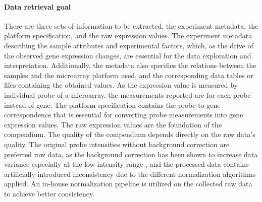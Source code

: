 






\paragraph{Data retrieval goal}\label{sec:command-data-goal}

There are three sets of information to be extracted, the experiment
metadata, the platform specification, and the raw expression values.
%
%
The experiment metadata describing the sample attributes and experimental
factors, which, as the drive of the observed gene expression changes, are
essential for the data exploration and interpretation.
%
Additionally, the metadata also specifies the relations between the samples
and the microarray platform used, and the corresponding data tables or files
containing the obtained values.
%
As the expression value is measured by individual probe of a microarray, the
measurements reported are for each probe instead of gene.
%
The platform specification contains the probe-to-gene correspondence that is
essential for converting probe measurements into gene expression values.
%
%
The raw expression values are the foundation of the compendium.  The quality of
the compendium depends directly on the raw data's quality.
%
The original probe intensities without background correction are preferred raw
data, as the background correction has been shown to increase data variance
especially at the low intensity range \cite{Irizarry2006, Ritchie2007}, and
the processed data contains artificially introduced inconsistency due to the
different normalization algorithms applied.
%
An in-house normalization pipeline is utilized on the collected raw data to
achieve better consistency.
%
